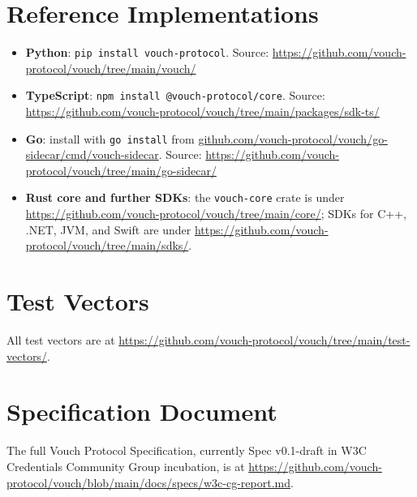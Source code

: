 \documentclass[11pt,a4paper]{article}
\begin{document}



\appendix

\section{Reference Implementations}

\begin{itemize}[leftmargin=*]
\item \textbf{Python}: \verb|pip install vouch-protocol|. Source: \url{https://github.com/vouch-protocol/vouch/tree/main/vouch/}
\item \textbf{TypeScript}: \verb|npm install @vouch-protocol/core|. Source: \url{https://github.com/vouch-protocol/vouch/tree/main/packages/sdk-ts/}
\item \textbf{Go}: install with \verb|go install| from \url{github.com/vouch-protocol/vouch/go-sidecar/cmd/vouch-sidecar}. Source: \url{https://github.com/vouch-protocol/vouch/tree/main/go-sidecar/}
\item \textbf{Rust core and further SDKs}: the \texttt{vouch-core} crate is under \url{https://github.com/vouch-protocol/vouch/tree/main/core/}; SDKs for C++, .NET, JVM, and Swift are under \url{https://github.com/vouch-protocol/vouch/tree/main/sdks/}.
\end{itemize}

\section{Test Vectors}

All test vectors are at \url{https://github.com/vouch-protocol/vouch/tree/main/test-vectors/}.

\section{Specification Document}

The full Vouch Protocol Specification, currently Spec v0.1-draft in W3C Credentials Community Group incubation, is at \url{https://github.com/vouch-protocol/vouch/blob/main/docs/specs/w3c-cg-report.md}.
\end{document}

